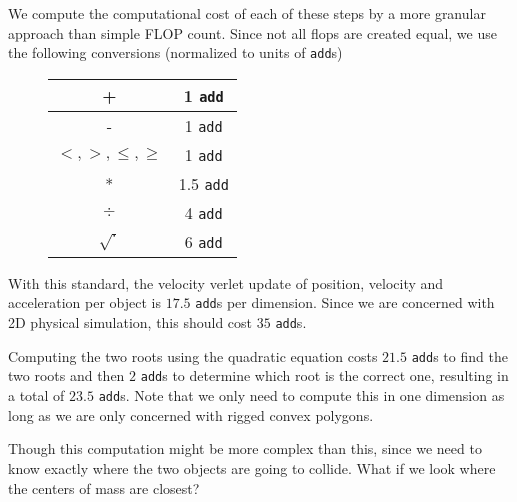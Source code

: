 \documentclass[a4paper,11pt, oneside]{article}
\begin{document}
\begin{enumerate}
We compute the computational cost of each of these steps by a more granular approach than simple FLOP count.  Since not all flops are created equal, we use the following conversions (normalized to units of \texttt{add}s)
\begin{figure}[ht]
   \centering
    \begin{tabular}{|c|c|}\hline
    + & 1 \texttt{add} \\\hline
    - & 1 \texttt{add} \\
    $<,>,\leq,\geq$ & 1 \texttt{add} \\
    * & 1.5 \texttt{add} \\
    $\div$ & 4 \texttt{add} \\
    $\sqrt{\cdot}$ & 6 \texttt{add}\\\hline
\end{tabular}
\end{figure}

With this standard, the velocity verlet update of position, velocity and acceleration per object is $17.5$ \texttt{add}s per dimension.  Since we are concerned with 2D physical simulation, this should cost $35$ \texttt{add}s.  

Computing the two roots using the quadratic equation costs $21.5$ \texttt{add}s to find the two roots and then $2$ \texttt{add}s to determine which root is the correct one, resulting in a total of $23.5$ \texttt{add}s.  Note that we only need to compute this in one dimension as long as we are only concerned with rigged convex polygons.  

Though this computation might be more complex than this, since we need to know exactly where the two objects are going to collide.  What if we look where the centers of mass are closest?

\end{enumerate}
\end{document}
